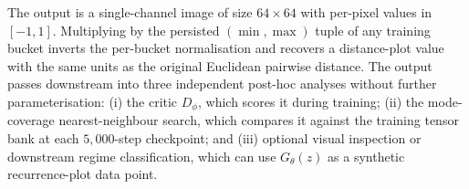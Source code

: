 
The output is a single-channel image of size $64 \times 64$ with
per-pixel values in $[-1, 1]$. Multiplying by the persisted
$(\min, \max)$ tuple of any training bucket inverts the per-bucket
normalisation and recovers a distance-plot value with the same units as
the original Euclidean pairwise distance. The output passes downstream
into three independent post-hoc analyses without further
parameterisation: (i) the critic $D_\phi$, which scores it during
training; (ii) the mode-coverage nearest-neighbour search, which
compares it against the training tensor bank at each $5{,}000$-step
checkpoint; and (iii) optional visual inspection or downstream regime
classification, which can use $G_\theta(z)$ as a synthetic
recurrence-plot data point.
